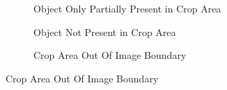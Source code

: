 {\begin{figure}[p]
\begin{subfigure}[][][t]{0.31\textwidth}
      \caption{Object Only Partially Present in Crop Area}
  \end{subfigure}\hfill
  \begin{subfigure}[][][t]{0.31\textwidth}
      \caption{Object Not Present in Crop Area}
  \end{subfigure}\hfill
  \begin{subfigure}[][][t]{0.31\textwidth}
      \caption{Crop Area Out Of Image Boundary}
  \end{subfigure}


\end{figure}}
